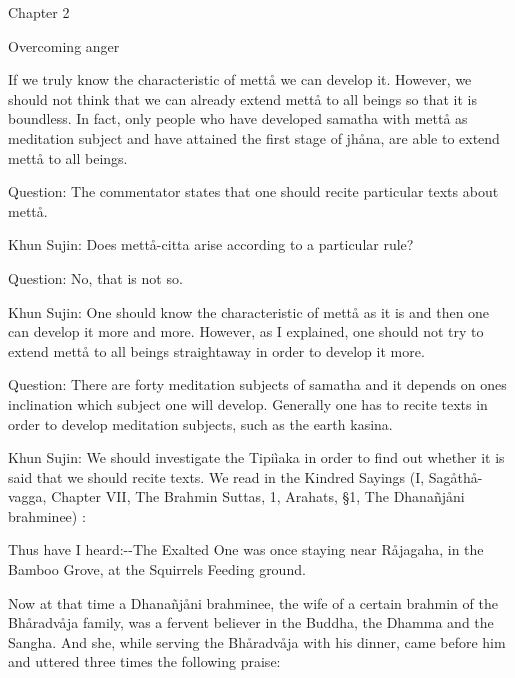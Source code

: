 \documentclass[12pt,twoside]{article}
\begin{document}
\bigskip

\clearpage
Chapter 2


\bigskip


\bigskip

Overcoming anger


\bigskip


\bigskip

If we truly know the characteristic of mett{\aa} we can develop it.
However, we should not think that we can already extend mett{\aa} to
all beings so that it is boundless. In fact, only people who have
developed samatha with mett{\aa} as meditation subject and have
attained the first stage of jh{\aa}na, are able to extend mett{\aa} to
all beings. 

Question: The commentator states that one should recite particular texts
about mett{\aa}. 

Khun Sujin: Does mett{\aa}{}-citta arise according to a particular rule?

Question: No, that is not so. 

Khun Sujin: One should know the characteristic of mett{\aa} as it is and
then one can develop it more and more. However, as I explained, one
should not try to extend mett{\aa} to all beings straightaway in order
to develop it more. 

Question: There are forty meditation subjects of samatha and it depends
on one{\textquotesingle}s inclination which subject one will develop.
Generally one has to recite texts in order to develop meditation
subjects, such as the {\textasciigrave}{\textasciigrave}earth
kasina{\textquotesingle}{\textquotesingle}. 

Khun Sujin: We should investigate the Tipi\`iaka in order to find out
whether it is said that we should recite texts. We read in the Kindred
Sayings (I, Sag{\aa}th{\aa}{}-vagga, Chapter VII, The Brahmin Suttas,
1, Arahats, {\S}1, The Dhana\~nj{\aa}ni brahminee) :


\bigskip

Thus have I heard:{}-{}-The Exalted One was once staying near
R{\aa}jagaha, in the Bamboo Grove, at the Squirrels{\textquotesingle}
Feeding ground. 

Now at that time a Dhana\~nj{\aa}ni brahminee, the wife of a certain
brahmin of the Bh{\aa}radv{\aa}ja family, was a fervent believer in the
Buddha, the Dhamma and the Sangha. And she, while serving the
Bh{\aa}radv{\aa}ja with his dinner, came before him and uttered three
times the following praise:
\end{document}
